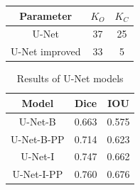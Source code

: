 \begin{table}
    \centering
    \begin{tabular}{|c|c|c|}
        \hline
        Parameter      & $K_O$ & $K_C$ \\ \hline
        U-Net          & 37    & 25    \\ \hline
        U-Net improved & 33    & 5     \\ \hline
    \end{tabular}
\end{table}

\begin{table}
    \centering
    \begin{tabular}{|c|c|c|}
        \hline
        Model      & Dice  & IOU   \\ \hline
        U-Net-B    & 0.663 & 0.575 \\ \hline
        U-Net-B-PP & 0.714 & 0.623 \\ \hline
        U-Net-I    & 0.747 & 0.662 \\ \hline
        U-Net-I-PP & 0.760 & 0.676 \\ \hline
    \end{tabular}
    \caption{Results of U-Net models}
\end{table}

